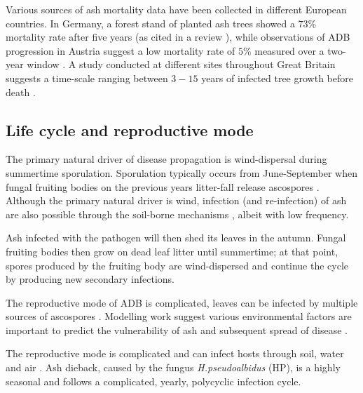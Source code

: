  Various sources of ash mortality data have been collected in different European countries. 
 In Germany, a forest stand of planted ash trees showed a $73\%$ mortality rate after five years \cite{langer2015ash} (as cited in a review \cite{enderle2017ash}), while observations of ADB progression in Austria suggest a low mortality rate of $5\%$ measured over a two-year window \cite{kessler2012dieback}. 
 A study conducted at different sites throughout Great Britain suggests a time-scale ranging between $3-15$ years of infected tree growth before death \cite{wylder2018evidence}.

\subsection{Life cycle and reproductive mode}

The primary natural driver of disease propagation is wind-dispersal during summertime sporulation.
Sporulation typically occurs from June-September when fungal fruiting bodies on the previous years litter-fall release ascospores \cite{grosdidier2018tracking, hietala2013invasive}.
Although the primary natural driver is wind, infection (and re-infection) of ash are also possible through the soil-borne mechanisms \cite{fones2016role}, albeit with low frequency.

Ash infected with the pathogen will then shed its leaves in the autumn. Fungal fruiting bodies then grow on dead leaf litter until summertime; at that point, spores produced by the fruiting body are wind-dispersed and continue the cycle by producing new secondary infections.%

The reproductive mode of ADB is complicated, leaves can be infected by multiple sources of ascospores \cite{gross2012reproductive}.
Modelling work suggest various environmental factors are important to predict the vulnerability of ash and subsequent spread of disease \cite{dal2014risk, chumanova2019predicting}.

The reproductive mode is complicated and can infect hosts through soil, water and air \cite{gross2012reproductive}.
Ash dieback, caused by the fungus \textit{H.pseudoalbidus} (HP), is a highly seasonal \cite{bengtsson2014seasonal} and follows a complicated, yearly, polycyclic infection cycle.

